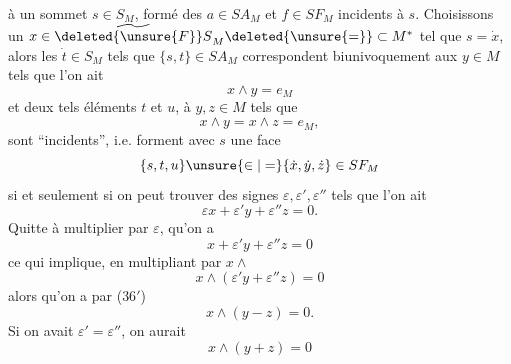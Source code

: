 à un sommet $s\in S_M$, formé des $a\in SA_M$ et $f\in SF_M$ incidents à $s$. Choisissons un $x\in\widetilde{\deleted{\unsure{F}}S}_M\deleted{\unsure{=}}\subset M^*$ tel que $s=\dot x$, alors les $\dot t\in S_M$ tels que $\{s,t\}\in SA_M$ correspondent biunivoquement aux $y\in M$ tels que l'on ait
\[
x\wedge y=e_M\tag*{(35)}
\]
et deux tels éléments $t$ et $u$,  à $y,z\in M$ tels que
\[
x\wedge y=x\wedge z=e_M,\tag*{($36'$)}
\]
sont ``incidents'', i.e. forment avec $s$ une face
\[
\{s,t,u\}\unsure{\in|=}\{\dot x,\dot y,\dot z\}\in SF_M
\]
si et seulement si on peut trouver des signes $\varepsilon,\varepsilon',\varepsilon''$ tels que l'on ait
\[
\varepsilon x+\varepsilon'y+\varepsilon''z=0.
\]
Quitte à multiplier par $\varepsilon$,  qu'on a
\[
x+\varepsilon'y+\varepsilon''z=0
\]
ce qui implique, en multipliant par $x\wedge$
\[
x\wedge(\varepsilon'y+\varepsilon''z)=0
\]
alors qu'on a par ($36'$)
\[
x\wedge(y-z)=0.
\]
Si on avait $\varepsilon'=\varepsilon''$, on aurait  
\[
x\wedge(y+z)=0
\]
